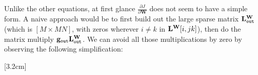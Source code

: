 Unlike the other equations, at first glance $\frac{\partial J}{\partial \mathbf{W}}$ does not seem to have a simple form. A naive approach would be to first build out the large sparse matrix $\mathbf{L}^{\mathbf{W}}_{\texttt{out}}$ (which is $[M \times MN]$, with zeros wherever $i \neq k$ in $\mathbf{L}^\mathbf{W}[i,jk]$), then do the matrix multiply $\mathbf{g}_{\texttt{out}}\mathbf{L}^{\mathbf{W}}_{\texttt{out}}$. We can avoid all those multiplications by zero by observing the following simplification:

[3.2cm]

